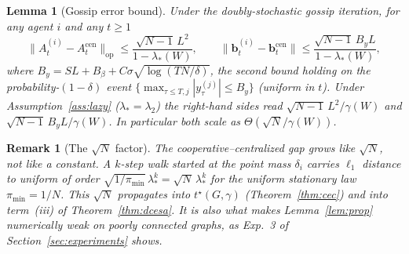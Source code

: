 \documentclass[11pt]{article}
\newtheorem{lemma}[theorem]{Lemma}
\newtheorem{remark}[theorem]{Remark}
\begin{document}
\begin{lemma}[Gossip error bound]\label{lem:gossip}
Under the doubly-stochastic gossip iteration, for any agent $i$ and any $t\geq 1$ \begin{equation}
\|A_t^{(i)}-A_t^{\mathrm{cen}}\|_{\mathrm{op}}
\leq\frac{\sqrt{N-1}\,L^2}{1-\lambda_*(W)},\qquad
\|\bm{b}_t^{(i)}-\bm{b}_t^{\mathrm{cen}}\|
\leq\frac{\sqrt{N-1}\,B_y L}{1-\lambda_*(W)},
\label{eq:gossip_err}
\end{equation}
where $B_y=SL+B_\beta+C\sigma\sqrt{\log(TN/\delta)}$, the second bound
holding on the probability-$(1-\delta)$ event
$\{\max_{\tau\leq T,j}|y_\tau^{(j)}|\leq B_y\}$ (uniform in $t$).
Under Assumption~\ref{ass:lazy} ($\lambda_*=\lambda_2$) the right-hand
sides read $\sqrt{N-1}\,L^2/\gamma(W)$ and
$\sqrt{N-1}\,B_y L/\gamma(W)$. In particular both scale as
$\Theta(\sqrt{N}/\gamma(W))$.
\end{lemma}

\begin{remark}[The $\sqrt{N}$ factor]\label{rem:sqrtN}
The cooperative--centralized gap grows like $\sqrt{N}$, not like a
constant.  A $k$-step walk started at the point mass $\delta_i$ carries
$\ell_1$ distance to uniform of order
$\sqrt{1/\pi_{\min}}\,\lambda_*^k=\sqrt{N}\,\lambda_*^k$ for the uniform
stationary law $\pi_{\min}=1/N$.  This $\sqrt{N}$ propagates
into $t^\star(G,\gamma)$ (Theorem~\ref{thm:cec}) and into term~(iii) of
Theorem~\ref{thm:dcesa}.  It is also what makes
Lemma~\ref{lem:prop} numerically weak on poorly connected graphs, as
Exp.~3 of Section~\ref{sec:experiments} shows.
\end{remark}
\end{document}
